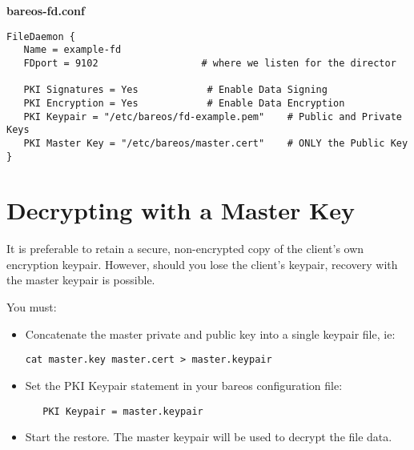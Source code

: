 {\bf bareos-fd.conf}
\footnotesize
\begin{verbatim}
FileDaemon {
   Name = example-fd
   FDport = 9102                  # where we listen for the director

   PKI Signatures = Yes            # Enable Data Signing
   PKI Encryption = Yes            # Enable Data Encryption
   PKI Keypair = "/etc/bareos/fd-example.pem"    # Public and Private Keys
   PKI Master Key = "/etc/bareos/master.cert"    # ONLY the Public Key
}
\end{verbatim}
\normalsize


\section{Decrypting with a Master Key}

It is preferable to retain a secure, non-encrypted copy of the
client's own encryption keypair. However, should you lose the
client's keypair, recovery with the master keypair is possible.

You must:
\begin{itemize}
\item Concatenate the master private and public key into a single
   keypair file, ie:
    \begin{verbatim}
cat master.key master.cert > master.keypair
    \end{verbatim}


\item Set the PKI Keypair statement in your bareos configuration file:
\begin{verbatim}
   PKI Keypair = master.keypair
\end{verbatim}

\item Start the restore. The master keypair will be used to decrypt
     the file data.

\end{itemize}
